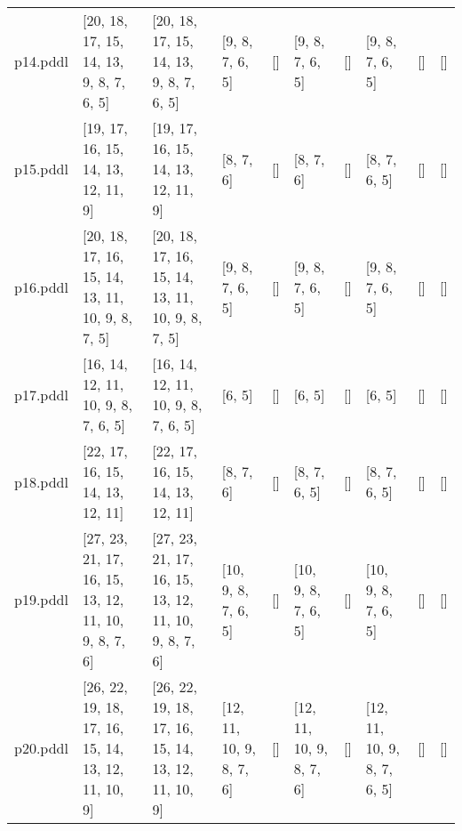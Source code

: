 \documentclass{article}
\begin{document}
\begin{tabular}{@{}lrrrrrrrrr@{}}
p14.pddl & \multicolumn{1}{|l|}{[20, 18, 17, 15, 14, 13, 9, 8, 7, 6, 5]} & \multicolumn{1}{|l|}{[20, 18, 17, 15, 14, 13, 9, 8, 7, 6, 5]} & \multicolumn{1}{|l|}{[9, 8, 7, 6, 5]} & \multicolumn{1}{|l|}{[]} & \multicolumn{1}{|l|}{[9, 8, 7, 6, 5]} & \multicolumn{1}{|l|}{[]} & \multicolumn{1}{|l|}{[9, 8, 7, 6, 5]} & \multicolumn{1}{|l|}{[]} & \multicolumn{1}{|l|}{[]} \\
p15.pddl & \multicolumn{1}{|l|}{[19, 17, 16, 15, 14, 13, 12, 11, 9]} & \multicolumn{1}{|l|}{[19, 17, 16, 15, 14, 13, 12, 11, 9]} & \multicolumn{1}{|l|}{[8, 7, 6]} & \multicolumn{1}{|l|}{[]} & \multicolumn{1}{|l|}{[8, 7, 6]} & \multicolumn{1}{|l|}{[]} & \multicolumn{1}{|l|}{[8, 7, 6, 5]} & \multicolumn{1}{|l|}{[]} & \multicolumn{1}{|l|}{[]} \\
p16.pddl & \multicolumn{1}{|l|}{[20, 18, 17, 16, 15, 14, 13, 11, 10, 9, 8, 7, 5]} & \multicolumn{1}{|l|}{[20, 18, 17, 16, 15, 14, 13, 11, 10, 9, 8, 7, 5]} & \multicolumn{1}{|l|}{[9, 8, 7, 6, 5]} & \multicolumn{1}{|l|}{[]} & \multicolumn{1}{|l|}{[9, 8, 7, 6, 5]} & \multicolumn{1}{|l|}{[]} & \multicolumn{1}{|l|}{[9, 8, 7, 6, 5]} & \multicolumn{1}{|l|}{[]} & \multicolumn{1}{|l|}{[]} \\
p17.pddl & \multicolumn{1}{|l|}{[16, 14, 12, 11, 10, 9, 8, 7, 6, 5]} & \multicolumn{1}{|l|}{[16, 14, 12, 11, 10, 9, 8, 7, 6, 5]} & \multicolumn{1}{|l|}{[6, 5]} & \multicolumn{1}{|l|}{[]} & \multicolumn{1}{|l|}{[6, 5]} & \multicolumn{1}{|l|}{[]} & \multicolumn{1}{|l|}{[6, 5]} & \multicolumn{1}{|l|}{[]} & \multicolumn{1}{|l|}{[]} \\
p18.pddl & \multicolumn{1}{|l|}{[22, 17, 16, 15, 14, 13, 12, 11]} & \multicolumn{1}{|l|}{[22, 17, 16, 15, 14, 13, 12, 11]} & \multicolumn{1}{|l|}{[8, 7, 6]} & \multicolumn{1}{|l|}{[]} & \multicolumn{1}{|l|}{[8, 7, 6, 5]} & \multicolumn{1}{|l|}{[]} & \multicolumn{1}{|l|}{[8, 7, 6, 5]} & \multicolumn{1}{|l|}{[]} & \multicolumn{1}{|l|}{[]} \\
p19.pddl & \multicolumn{1}{|l|}{[27, 23, 21, 17, 16, 15, 13, 12, 11, 10, 9, 8, 7, 6]} & \multicolumn{1}{|l|}{[27, 23, 21, 17, 16, 15, 13, 12, 11, 10, 9, 8, 7, 6]} & \multicolumn{1}{|l|}{[10, 9, 8, 7, 6, 5]} & \multicolumn{1}{|l|}{[]} & \multicolumn{1}{|l|}{[10, 9, 8, 7, 6, 5]} & \multicolumn{1}{|l|}{[]} & \multicolumn{1}{|l|}{[10, 9, 8, 7, 6, 5]} & \multicolumn{1}{|l|}{[]} & \multicolumn{1}{|l|}{[]} \\
p20.pddl & \multicolumn{1}{|l|}{[26, 22, 19, 18, 17, 16, 15, 14, 13, 12, 11, 10, 9]} & \multicolumn{1}{|l|}{[26, 22, 19, 18, 17, 16, 15, 14, 13, 12, 11, 10, 9]} & \multicolumn{1}{|l|}{[12, 11, 10, 9, 8, 7, 6]} & \multicolumn{1}{|l|}{[]} & \multicolumn{1}{|l|}{[12, 11, 10, 9, 8, 7, 6]} & \multicolumn{1}{|l|}{[]} & \multicolumn{1}{|l|}{[12, 11, 10, 9, 8, 7, 6, 5]} & \multicolumn{1}{|l|}{[]} & \multicolumn{1}{|l|}{[]} \\
\end{tabular}
\end{document}
